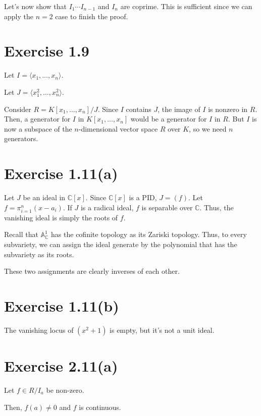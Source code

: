 \documentclass{article}
\theoremstyle{definition}
\begin{document}
Let's now show that $ I_{1} \cdots I_{n - 1} $ and $ I_{n} $ are coprime.
This is sufficient since we can apply the $ n = 2 $ case to finish the proof.


\section{Exercise 1.9}

Let $ I = \langle x_{1}, \ldots, x_{n} \rangle $.

Let $ J = \langle x_{1}^{2}, \ldots, x_{n}^{2} \rangle $.

Consider $ R = K[x_{1}, \ldots, x_{n}]/J $. Since $ I $ contains $ J $,
the image of $ I $ is nonzero in $ R $. Then, a generator for $ I $ in 
$ K[x_{1}, \ldots, x_{n}] $ would be a generator for $ I $ in $ R $.
But $ I $ is now a subspace of the $ n $-dimensional vector space $ R $
over $ K $, so we need $ n $ generators.

\section{Exercise 1.11(a)}

Let $ J $ be an ideal in $ \mathbb{C}[x] $.
Since $ \mathbb{C}[x] $ is a PID, $ J = (f) $.
Let $ f = \pi_{i = 1}^{n} (x - a_{i}) $.
If $ J $ is a radical ideal, $ f $ is separable over $ \mathbb{C} $.
Thus, the vanishing ideal is simply the roots of $ f $.

Recall that $ \mathbb{A}^{1}_{\mathbb{C}} $ has the cofinite topology
as its Zariski topology. Thus, to every subvariety, we can assign
the ideal generate by the polynomial that has the subvariety as its
roots.

These two assignments are clearly inverses of each other.

\section{Exercise 1.11(b)}

The vanishing locus of $ (x^{2} + 1) $ is empty, but it's not a unit ideal.

\section{Exercise 2.11(a)}

Let $ f \in R / I_{a} $ be non-zero.

Then, $ f(a) \neq 0 $ and $ f $ is continuous.
\end{document}

